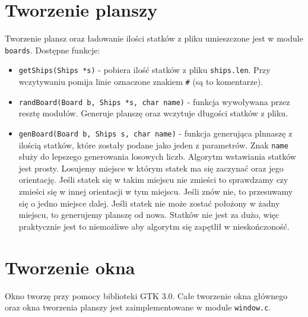 \documentclass[a4paper]{article}
\begin{document}
\section{Tworzenie planszy}
Tworzenie plansz oraz ładowanie ilości statków z pliku umieszczone jest w module \texttt{boards}. 
Dostępne funkcje:
\begin{itemize}
    \item \texttt{getShips(Ships *s)} - pobiera ilość statków z pliku \texttt{ships.len}. Przy wczytywaniu
pomija linie oznaczone znakiem \texttt{\#} (są to komentarze).
    \item \texttt{randBoard(Board b, Ships *s, char name)} - funkcja wywoływana przez resztę modułów.
Generuje planszę oraz wczytuje długości statków z pliku.
    \item \texttt{genBoard(Board b, Ships s, char name)} - funkcja generująca plnnaszę z ilością statków,
które zostały podane jako jeden z parametrów. Znak \texttt{name} służy do lepszego generowania losowych liczb. 
Algorytm wstawiania statków jest prosty. Losujemy miejsce w którym statek ma się zaczynać oraz jego orientację. 
Jeśli statek się w takim miejscu nie zmieści to sprawdzamy czy zmieści się w innej orientacji w tym miejscu. 
Jeśli znów nie, to przesuwamy się o jedno miejsce dalej. Jeśli statek nie może zostać położony w żadny miejscu,
to generujemy planszę od nowa. Statków nie jest za dużo, więc praktycznie jest to niemożliwe aby algorytm się zapętlił w nieskończoność.
\end{itemize}

\section{Tworzenie okna}
Okno tworzę przy pomocy biblioteki GTK 3.0. Całe tworzenie okna głównego oraz okna tworzenia planszy jest zaimplementowane w module \texttt{window.c}.
\end{document}
